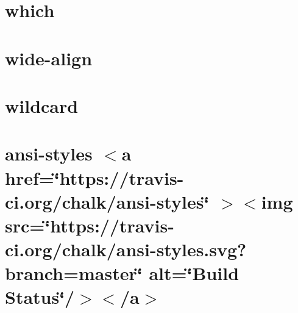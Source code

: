 \documentclass[twoside]{book}
\newcommand{\+}{\discretionary{\mbox{\scriptsize$\hookleftarrow$}}{}{}}
\begin{document}
\chapter{which}
\label{md__c___users_vaishnavi_jadhav__desktop__developer_code_mean_stack_example_client_node_modules_which__r_e_a_d_m_e}

\chapter{wide-\/align}
\label{md__c___users_vaishnavi_jadhav__desktop__developer_code_mean_stack_example_client_node_modules_wide_align__r_e_a_d_m_e}

\chapter{wildcard}
\label{md__c___users_vaishnavi_jadhav__desktop__developer_code_mean_stack_example_client_node_modules_wildcard__r_e_a_d_m_e}

\chapter{ansi-\/styles \texorpdfstring{$<$}{<}a href=\char`\"{}https\+://travis-\/ci.\+org/chalk/ansi-\/styles\char`\"{} \texorpdfstring{$>$}{>}\texorpdfstring{$<$}{<}img src=\char`\"{}https\+://travis-\/ci.\+org/chalk/ansi-\/styles.\+svg?branch=master\char`\"{} alt=\char`\"{}\+Build Status\char`\"{}/\texorpdfstring{$>$}{>}\texorpdfstring{$<$}{<}/a\texorpdfstring{$>$}{>}}
\label{md__c___users_vaishnavi_jadhav__desktop__developer_code_mean_stack_example_client_node_modules_w4ab0d6a1d71fe51732be9da4dad2650f}

\end{document}
